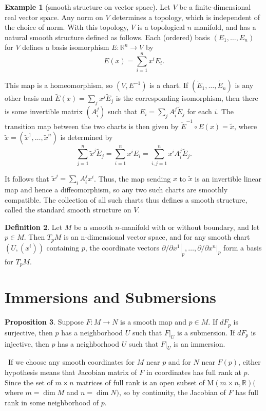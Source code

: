 \documentclass[12pt,a4paper]{book}
\newenvironment{prooff}{{\noindent\it\textcolor{cyan!40!black}{Proof}:}\,}{\par}
\theoremstyle{definition}
\newtheorem{defn}{Definition}[section]
\newtheorem{prop}[defn]{Proposition}
\newtheorem{exam}[defn]{Example}
\begin{document}
\begin{exam}[smooth structure on vector space]
    Let $V$ be a finite-dimensional real vector
    space. Any norm on $V$ determines a topology,
    which is independent of the choice of norm. With this topology, $V$ is a topological $n$ manifold, and has a natural smooth structure defined as follows. Each (ordered) basis $\left(E_1, \ldots, E_n\right)$ for $V$ defines a basis isomorphism $E: \mathbb{R}^n \rightarrow V$ by
    $$
        E(x)=\sum_{i=1}^n x^i E_i .
    $$

    This map is a homeomorphism, so $\left(V, E^{-1}\right)$ is a chart. If $\left(\widetilde{E}_1, \ldots, \widetilde{E}_n\right)$ is any other basis and $\widetilde{E}(x)=\sum_j x^j \widetilde{E}_j$ is the corresponding isomorphism, then there is some invertible matrix $\left(A_i^j\right)$ such that $E_i=\sum_j A_i^j \widetilde{E}_j$ for each $i$. The transition map between the two charts is then given by $\widetilde{E}^{-1} \circ E(x)=\tilde{x}$, where $\tilde{x}=\left(\widetilde{x}^1, \ldots, \tilde{x}^n\right)$
    is determined by
    $$
        \sum_{j=1}^n \widetilde{x}^j \widetilde{E}_j=\sum_{i=1}^n x^i E_i=\sum_{i, j=1}^n x^i A_i^j \widetilde{E}_j .
    $$

    It follows that $\tilde{x}^j=\sum_i A_i^j x^i$. Thus, the map sending $x$ to $\tilde{x}$ is an invertible linear map and hence a diffeomorphism, so any two such charts are smoothly compatible. The collection of all such charts thus defines a smooth structure, called the standard smooth structure on $V$.
\end{exam}
\begin{defn}
    Let $M$ be a smooth $n$-manifold with or without boundary, and let $p \in M$. Then $T_p M$ is an n-dimensional vector space, and for any smooth chart $\left(U,\left(x^i\right)\right)$ containing $p$, the coordinate vectors $\partial /\left.\partial x^1\right|_p, \ldots, \partial /\left.\partial x^n\right|_p$ form a basis for $T_p M$.
\end{defn}
\section{Immersions and Submersions}
\begin{prop}
    Suppose $F: M \rightarrow N$ is a smooth map and $p \in M$. If $d F_p$ is surjective, then $p$ has a neighborhood $U$ such that $\left.F\right|_U$ is a submersion. If $d F_p$ is injective, then $p$ has a neighborhood $U$ such that $\left.F\right|_U$ is an immersion.
\end{prop}
\begin{prooff}
    If we choose any smooth coordinates for $M$ near $p$ and for $N$ near $F(p)$, either hypothesis means that Jacobian matrix of $F$ in coordinates has full rank at $p$. Since the set of $m \times n$ matrices of full rank is an open subset of $\mathrm{M}(m \times n, \mathbb{R})($ where $m=\operatorname{dim} M$ and $n=\operatorname{dim} N)$,
    so by continuity, the Jacobian of $F$ has full rank in some neighborhood of $p$.
\end{prooff}
\end{document}
